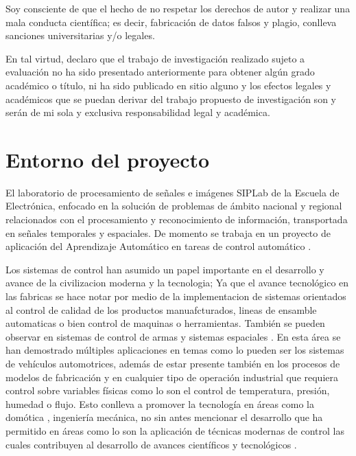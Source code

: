 \documentclass[12pt]{article}
\begin{document}
Soy consciente de que el hecho de no respetar los derechos de autor y realizar una mala conducta científica; es decir, fabricación de datos falsos y plagio, conlleva
sanciones universitarias y/o legales.

En tal virtud, declaro que el trabajo de investigación realizado sujeto a evaluación no ha sido presentado anteriormente para obtener algún grado académico o título, ni ha sido publicado en sitio alguno y los efectos legales y académicos que se puedan derivar del trabajo propuesto de investigación son y serán de mi sola y exclusiva responsabilidad legal y académica.

\newpage
\tableofcontents

\newpage

\section{Entorno del proyecto}

El laboratorio de procesamiento de señales e imágenes SIPLab de la Escuela de Electrónica, enfocado en la solución de problemas de ámbito nacional y regional relacionados con el procesamiento y reconocimiento de información, transportada en señales temporales y espaciales. De momento se trabaja en un proyecto de aplicación del Aprendizaje Automático en tareas de control automático  \cite{1} \cite{13-se}.

Los sistemas de control han asumido un papel importante en el desarrollo y avance de la civilizacion moderna y la tecnologia\cite{2}; Ya que el avance tecnológico en las fabricas se hace notar por medio de la implementacion de sistemas orientados al control de calidad de los productos manuafcturados, lineas de ensamble automaticas o bien control de maquinas o herramientas. También se pueden observar en sistemas de control de armas y sistemas espaciales \cite{kuo1996sistemas}. En esta área se han demostrado múltiples aplicaciones en temas como lo pueden ser los sistemas de vehículos automotrices, además de estar presente también en los procesos de modelos de fabricación y en cualquier tipo de operación industrial que requiera control sobre variables físicas como lo son el control de temperatura, presión, humedad o flujo. Esto conlleva a promover la tecnología en áreas como la domótica , ingeniería mecánica, no sin antes mencionar el desarrollo que ha permitido en áreas como lo son la aplicación de técnicas modernas de control las cuales contribuyen al desarrollo de avances científicos y tecnológicos \cite{4} \cite{3}.
\end{document}
